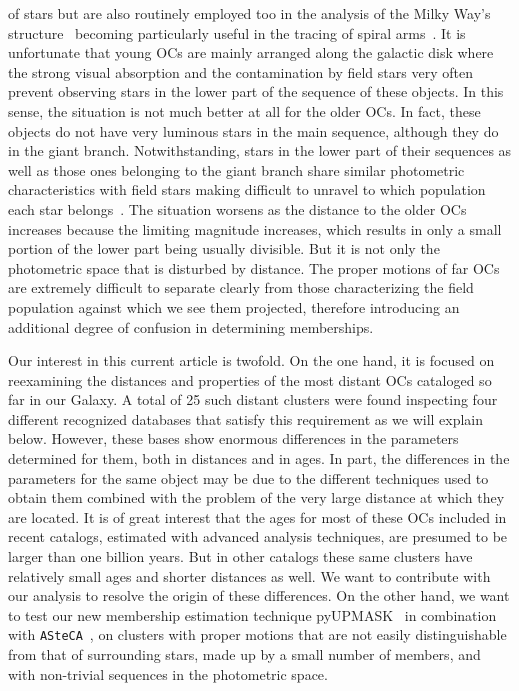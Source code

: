 \documentclass[draft]{aa}
\begin{document}
 of stars \citep{Lada2003} but are also routinely employed too in the analysis
 of the Milky Way's
 structure~\citep{Loktin_1992,Moitinho_2006,Vazquez2008,Moitinho_2010}
 becoming particularly useful in the tracing of spiral
 arms~\citep{carraro_2013,Molina_2018}.
 It is unfortunate that young OCs are mainly arranged along the galactic disk
 where the strong visual absorption and the contamination by field stars very
 often prevent observing stars in the lower part of the sequence of these
 objects. In this sense, the situation is not much better at all for the older
 OCs. In fact, these objects do not have very luminous stars in the main
 sequence, although they do in the giant branch. Notwithstanding, stars in the
 lower part of their sequences as well as those ones belonging to the giant
 branch share similar photometric characteristics with field stars making
 difficult to unravel to which population each star belongs~\citep{Hayes2015}.
 The situation worsens as the distance to the older OCs increases because the
 limiting magnitude increases, which results in only a small portion of
 the lower part being usually divisible. But it is not only the photometric
 space that is disturbed by distance. The proper motions of far OCs are
 extremely difficult to separate clearly from those characterizing the field
 population against which we see them projected, therefore introducing an
 additional degree of confusion in determining memberships.

 Our interest in this current article is twofold. On the one hand, it is focused
 on reexamining the distances and properties of the most distant OCs cataloged
 so far in our Galaxy. A total of 25 such distant clusters were found
 inspecting four different recognized databases that satisfy this requirement as
 we will explain below. However, these bases show enormous differences in the
 parameters determined for them, both in distances and in ages. In part, the
 differences in the parameters for the same object may be
 due to the different techniques used to obtain them combined with the problem
 of the very large distance at which they are located.
 It is of great interest that the ages for most of these OCs included in recent
 catalogs, estimated with advanced analysis techniques, are presumed to be
 larger than one billion years. But in other catalogs these same clusters have
 relatively small ages and shorter distances as well. We want to
 contribute with our analysis to resolve the origin of these differences.
 On the other hand, we want to test our new membership estimation technique
 pyUPMASK~\citep{Pera_2021} in combination with
 \texttt{ASteCA}~\citep{Perren_2015}, on clusters with proper motions that are
 not easily distinguishable from that of surrounding stars, made up by a small
 number of members, and with non-trivial sequences in the photometric space.\\
\end{document}
